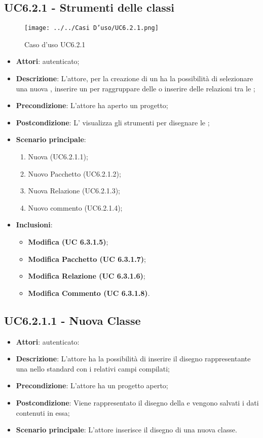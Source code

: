 \subsection{UC6.2.1 - Strumenti delle classi}
\label{ssec:UC6.2.1}
\begin{figure}[h!]
\centering
\texttt{[image: ../../Casi D'uso/UC6.2.1.png]}
\caption{Caso d'uso UC6.2.1}
 \end{figure}
\begin{itemize}
\item \textbf{Attori}:  autenticato;
\item \textbf{Descrizione}: L'attore, per la creazione di un  ha la possibilità di selezionare una nuova , inserire un  per raggruppare delle  o inserire delle relazioni tra le ;
\item \textbf{Precondizione}: L'attore ha aperto un progetto;
\item \textbf{Postcondizione}: L' visualizza gli strumenti per disegnare le ;
\item \textbf{Scenario principale}: \begin{enumerate}\item Nuova  (UC6.2.1.1);\item Nuovo Pacchetto (UC6.2.1.2);\item Nuova Relazione (UC6.2.1.3);\item Nuovo commento (UC6.2.1.4);
 \end{enumerate}
 \item \textbf{Inclusioni}: \begin{itemize}
 	\item \textbf{ Modifica  (UC 6.3.1.5)};
 	\item \textbf{ Modifica Pacchetto (UC 6.3.1.7)};
 	\item \textbf{ Modifica Relazione (UC 6.3.1.6)};
 	\item \textbf{ Modifica Commento (UC 6.3.1.8)}.
 \end{itemize}
\end{itemize}
\subsection{UC6.2.1.1 - Nuova Classe}
\label{ssec:UC6.2.1.1}
\begin{itemize}
\item \textbf{Attori}:  autenticato:
\item \textbf{Descrizione}: L'attore ha la possibilità di inserire il disegno rappresentante una  nello standard  con i relativi campi compilati;
\item \textbf{Precondizione}: L'attore ha un progetto aperto;
\item \textbf{Postcondizione}: Viene rappresentato il disegno della  e vengono salvati i dati contenuti in essa;
\item \textbf{Scenario principale}: L'attore inserisce il disegno di una nuova classe.
\end{itemize}
